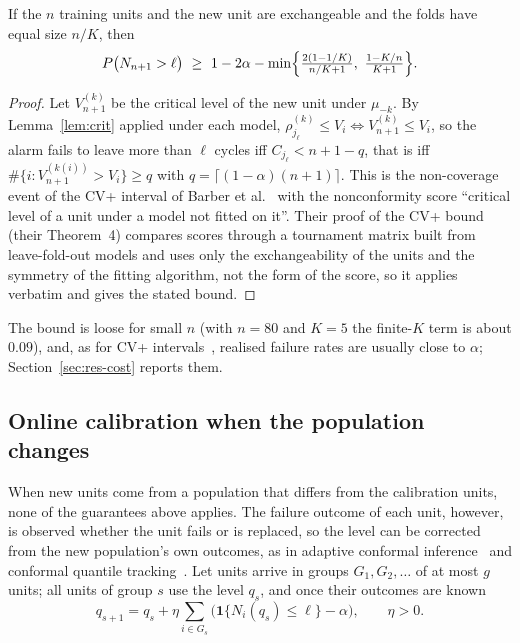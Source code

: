 \begin{theorem}\label{thm:cvplus}
If the $n$ training units and the new unit are exchangeable and the folds have equal size $n/K$, then
\[
P\bigl(N_{n+1}>\ell\bigr)\ \ge\ 1-2\alpha-\min\Bigl\{\tfrac{2(1-1/K)}{n/K+1},\ \tfrac{1-K/n}{K+1}\Bigr\}.
\]
\end{theorem}
\begin{proof}
Let $V^{(k)}_{n+1}$ be the critical level of the new unit under $\mu_{-k}$. By Lemma~\ref{lem:crit} applied under each model, $\rho^{(k)}_{j_\ell}\le V_i\iff V^{(k)}_{n+1}\le V_i$, so the alarm fails to leave more than $\ell$ cycles iff $C_{j_\ell}<n+1-q$, that is iff $\#\{i:V^{(k(i))}_{n+1}>V_i\}\ge q$ with $q=\lceil(1-\alpha)(n+1)\rceil$. This is the non-coverage event of the CV+ interval of Barber et al.~\cite{barber2021} with the nonconformity score ``critical level of a unit under a model not fitted on it''. Their proof of the CV+ bound (their Theorem~4) compares scores through a tournament matrix built from leave-fold-out models and uses only the exchangeability of the units and the symmetry of the fitting algorithm, not the form of the score, so it applies verbatim and gives the stated bound.
\end{proof}

The bound is loose for small $n$ (with $n=80$ and $K=5$ the finite-$K$ term is about $0.09$), and, as for CV+ intervals~\cite{barber2021}, realised failure rates are usually close to $\alpha$; Section~\ref{sec:res-cost} reports them.

\subsection{Online calibration when the population changes}

When new units come from a population that differs from the calibration units, none of the guarantees above applies. The failure outcome of each unit, however, is observed whether the unit fails or is replaced, so the level can be corrected from the new population's own outcomes, as in adaptive conformal inference~\cite{gibbs2021} and conformal quantile tracking~\cite{angelopoulos2023pid}. Let units arrive in groups $G_1,G_2,\dots$ of at most $g$ units; all units of group $s$ use the level $q_s$, and once their outcomes are known
\begin{equation}\label{eq:online}
q_{s+1}=q_s+\eta\sum_{i\in G_s}\bigl(\mathbf 1\{N_i(q_s)\le\ell\}-\alpha\bigr),\qquad \eta>0 .
\end{equation}

